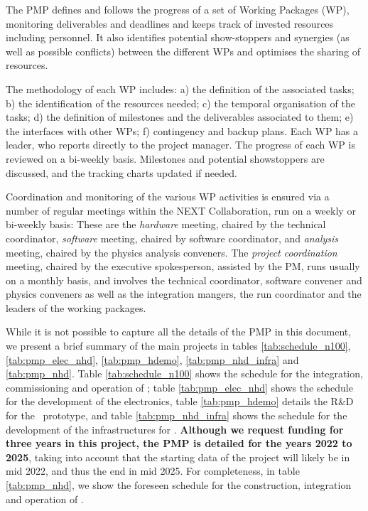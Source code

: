 The PMP defines and follows the progress of a set of Working Packages (WP), monitoring deliverables and deadlines and keeps track of invested resources including personnel. It also identifies potential show-stoppers and synergies (as well as possible conflicts) between the different WPs and optimises the sharing of resources. 


The methodology of each WP includes: a) the definition of the associated tasks; b) the identification of the resources needed; c) the temporal organisation of the tasks; d) the definition of milestones and the deliverables associated to them; e) the interfaces with other WPs; f) contingency and backup plans. Each WP has a leader, who reports directly to the project manager. The progress of each WP is reviewed on a bi-weekly basis. Milestones and potential showstoppers are discussed, and the tracking charts updated if needed.

Coordination and monitoring of the various WP activities is ensured via a number of regular meetings within the NEXT Collaboration, run on a weekly or bi-weekly basis: These are the  {\em hardware} meeting, chaired by the technical coordinator, {\em software} meeting, chaired by software coordinator, and {\em analysis} meeting, chaired by the physics analysis conveners. The {\em project coordination} meeting, chaired by the  executive spokesperson, assisted by the PM, runs usually on a monthly basis, and involves the technical coordinator, software convener and physics conveners as well as the integration mangers, the run coordinator and the leaders of the working packages. 


While it is not possible to capture all the details of the PMP in this document, we present a brief summary of the main projects in tables \ref{tab:schedule_n100}, \ref{tab:pmp_elec_nhd}, \ref{tab:pmp_hdemo}, \ref{tab:pmp_nhd_infra} and
\ref{tab:pmp_nhd}. Table  \ref{tab:schedule_n100} shows the schedule for the integration, commissioning and operation of \Next; 
table \ref{tab:pmp_elec_nhd} shows the schedule for the development of the electronics, table \ref{tab:pmp_hdemo} details the R\&D for the \HDEMO\ prototype, and table \ref{tab:pmp_nhd_infra} shows the schedule for the development of the infrastructures for \NHD. {\bf Although we request funding for three years in this project, the PMP is detailed for the years 2022 to 2025}, taking into account that the starting data of the project will likely be in mid 2022, and thus the end in mid 2025. For completeness, in table \ref{tab:pmp_nhd}, we show the foreseen schedule for the construction, integration and operation of \NHD.







